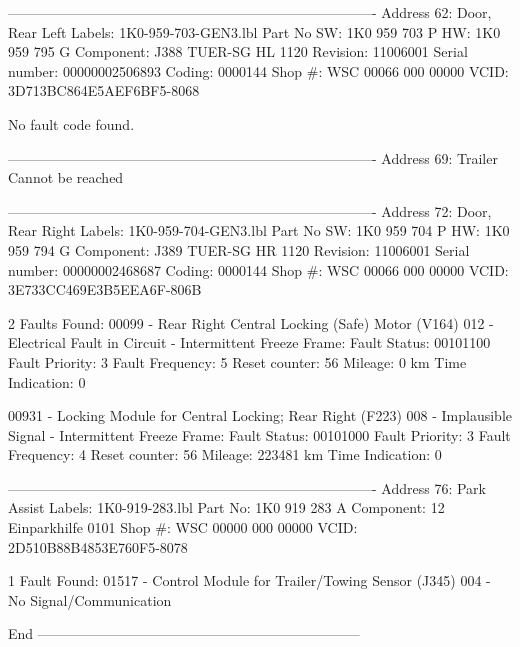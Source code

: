 -------------------------------------------------------------------------------
Address 62: Door, Rear Left        Labels: 1K0-959-703-GEN3.lbl
   Part No SW: 1K0 959 703 P    HW: 1K0 959 795 G
   Component: J388   TUER-SG HL   1120  
   Revision: 11006001    Serial number: 00000002506893
   Coding: 0000144
   Shop #: WSC 00066 000 00000
   VCID: 3D713BC864E5AEF6BF5-8068

No fault code found.

-------------------------------------------------------------------------------
Address 69: Trailer
Cannot be reached

-------------------------------------------------------------------------------
Address 72: Door, Rear Right        Labels: 1K0-959-704-GEN3.lbl
   Part No SW: 1K0 959 704 P    HW: 1K0 959 794 G
   Component: J389   TUER-SG HR   1120  
   Revision: 11006001    Serial number: 00000002468687
   Coding: 0000144
   Shop #: WSC 00066 000 00000
   VCID: 3E733CC469E3B5EEA6F-806B

2 Faults Found:
00099 - Rear Right Central Locking (Safe) Motor (V164) 
            012 - Electrical Fault in Circuit - Intermittent
             Freeze Frame:
                    Fault Status: 00101100
                    Fault Priority: 3
                    Fault Frequency: 5
                    Reset counter: 56
                    Mileage: 0 km
                    Time Indication: 0

00931 - Locking Module for Central Locking; Rear Right (F223) 
            008 - Implausible Signal - Intermittent
             Freeze Frame:
                    Fault Status: 00101000
                    Fault Priority: 3
                    Fault Frequency: 4
                    Reset counter: 56
                    Mileage: 223481 km
                    Time Indication: 0


-------------------------------------------------------------------------------
Address 76: Park Assist        Labels: 1K0-919-283.lbl
   Part No: 1K0 919 283 A
   Component: 12 Einparkhilfe     0101  
   Shop #: WSC 00000 000 00000
   VCID: 2D510B88B4853E760F5-8078

1 Fault Found:
01517 - Control Module for Trailer/Towing Sensor (J345) 
            004 - No Signal/Communication

End   ---------------------------------------------------------------------
